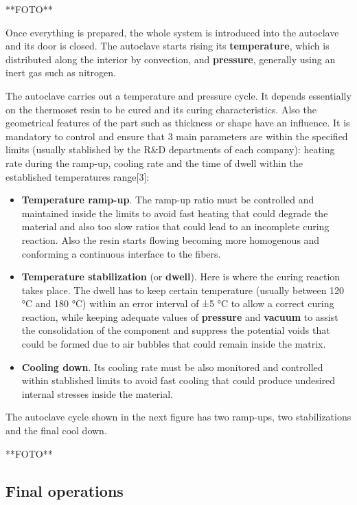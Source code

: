 **FOTO**

Once everything is prepared, the whole system is introduced into the autoclave and its door is closed. The autoclave starts rising its \textbf{temperature}, which is distributed along the interior by convection, and \textbf{pressure}, generally using an inert gas such as nitrogen. 

The autoclave carries out a temperature and pressure cycle. It depends essentially on the thermoset resin to be cured and its curing characteristics. Also the geometrical features of the part such as thickness or shape have an influence. It is mandatory to control and ensure that 3 main parameters are within the specified limits (usually stablished by the R&D departments of each company): heating rate during the ramp-up, cooling rate and the time of dwell within the established temperatures range[3]:

\begin{itemize}
\item \textbf{Temperature ramp-up}. The ramp-up ratio must be controlled and maintained inside the limits to avoid fast heating that could degrade the material and also too slow ratios that could lead to an incomplete curing reaction. Also the resin starts flowing becoming more homogenous and conforming a continuous interface to the fibers. 
\item \textbf{Temperature stabilization} (or \textbf{dwell}). Here is where the curing reaction takes place. The dwell has to keep certain temperature (usually between 120 °C and 180 °C) within an error interval of ±5 °C to allow a correct curing reaction, while keeping adequate values of \textbf{pressure} and \textbf{vacuum} to assist the consolidation of the component and suppress the potential voids that could be formed due to air bubbles that could remain inside the matrix.
\item \textbf{Cooling down}. Its cooling rate must be also monitored and controlled within stablished limits to avoid fast cooling that could produce undesired internal stresses inside the material.
\end{itemize}

The autoclave cycle shown in the next figure has two ramp-ups, two stabilizations and the final cool down.

**FOTO**

\subsection{Final operations}

